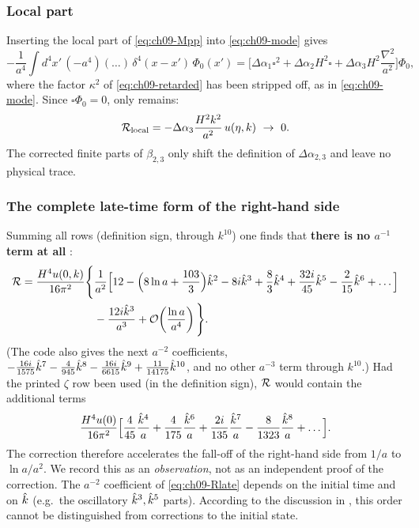 \subsubsection{Local part}
Inserting the local part of \eqref{eq:ch09-Mpp} into \eqref{eq:ch09-mode} gives
\begin{equation*}
-\frac1{a^4}\int d^4x'\,(-a^4)(\ldots)\,\delta^4(x-x')\,\Phi_0(x')=\Big[\Delta\alpha_1\square^2+\Delta\alpha_2H^2\square+\Delta\alpha_3H^2\frac{\nabla^2}{a^2}\Big]\Phi_0 ,
\end{equation*}
where the factor $\kappa^2$ of \eqref{eq:ch09-retarded} has been stripped off, as in \eqref{eq:ch09-mode}.
Since $\square\Phi_0=0$, only  remains:
\begin{equation}
\mathcal{R}_{\rm local}=-\Delta\alpha_3\frac{H^2k^2}{a^2}\,u(\eta,k)\ \to\ 0 .
\label{eq:ch09-local}
\end{equation}
The corrected finite parts of $\beta_{2,3}$ only shift the definition of $\Delta\alpha_{2,3}$ and leave no physical trace.

\subsubsection{The complete late-time form of the right-hand side}
Summing all rows (definition sign, through $k^{10}$) one finds that \textbf{there is no $a^{-1}$ term at all} \tD\tC:
\begin{equation}
\begin{split}
\mathcal{R}=\frac{H^4u(0,k)}{16\pi^2}\Bigg\{&\frac{1}{a^2}\Big[12-\Big(8\ln a+\frac{103}3\Big)\hat k^2-8i\hat k^3+\frac83\hat k^4+\frac{32i}{45}\hat k^5-\frac2{15}\hat k^6+\ldots\Big]\\
&-\frac{12i\hat k^3}{a^3}+\mathcal{O}\!\left(\frac{\ln a}{a^4}\right)\Bigg\}.
\end{split}
\label{eq:ch09-Rlate}
\end{equation}
(The code also gives the next $a^{-2}$ coefficients, $-\tfrac{16i}{1575}\hat k^7-\tfrac4{945}\hat k^8-\tfrac{16i}{6615}\hat k^9+\tfrac{11}{14175}\hat k^{10}$, and no other $a^{-3}$ term through $k^{10}$.)
Had the printed $\zeta$ row been used (in the definition sign), $\mathcal{R}$ would contain the additional terms
\begin{equation}
\frac{H^4u(0)}{16\pi^2}\Big[\frac4{45}\frac{\hat k^4}{a}+\frac4{175}\frac{\hat k^6}{a}+\frac{2i}{135}\frac{\hat k^7}{a}-\frac{8}{1323}\frac{\hat k^8}{a}+\ldots\Big].
\label{eq:ch09-Rprinted}
\end{equation}
The correction therefore accelerates the fall-off of the right-hand side from $1/a$ to $\ln a/a^2$. We record this as an \emph{observation}, not as an independent proof of the correction.
The $a^{-2}$ coefficient of \eqref{eq:ch09-Rlate} depends on the initial time and on $\hat k$ (e.g.\ the oscillatory $\hat k^3,\hat k^5$ parts). According to the discussion in \PII,
this order cannot be distinguished from corrections to the initial state.

